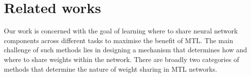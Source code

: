 





\section{Related works}
\vspace{-2mm}
Our work is concerned with the goal of learning where to share neural network components across different tasks to maximise the benefit of MTL. The main challenge of such methods lies in designing a mechanism that determines how and where to share weights within the network. There are broadly two categories of methods that determine the nature of weight sharing in MTL networks.


